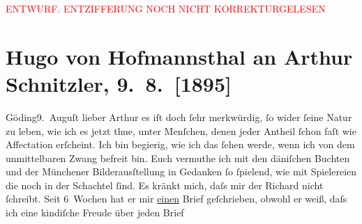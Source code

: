 
\begin{center}
            \textcolor{red}{ENTWURF. ENTZIFFERUNG NOCH NICHT KORREKTURGELESEN}
                      \end{center}
            
               \section[Hugo von Hofmannsthal an Arthur Schnitzler, 9. 8. {[}1895{]}]{ Hugo von Hofmannsthal an Arthur Schnitzler, 9. 8. {[}1895{]}}\nopagebreak{}\rehead{ }\begin{ledgroupsized}[t]{13cm}\normalsize\beginnumbering{} \toendnotes[C]{\smallbreak\pagebreak[2]} 
\pstart
           \raggedleft{}{\pb}Göding9. Auguſt\pend
           \pstart{}lieber Arthur\pend\pstart
           es iſt doch ſehr merkwürdig, ſo wider ſeine Natur zu leben, wie ich es jetzt
                    thue, unter Menſchen, denen jeder Antheil ſchon faſt wie Affectation erſcheint.
                    Ich bin begierig, wie ich das ſehen werde, wenn ich von dem unmittelbaren Zwang
                    befreit bin. Euch vermuthe ich mit den däniſchen Buchten und der Münchener
                    Bilderausſtellung in {\pb}Gedanken ſo ſpielend, wie mit Spielereien die noch in der Schachtel ſind. Es
                    kränkt mich, daſs mir der Richard nicht
                    ſchreibt. Seit 6 Wochen hat er mir \uline{einen} Brief
                    geſchrieben, obwohl er weiß, daſs ich eine kindiſche Freude über jeden Brief

\end{ledgroupsized}
